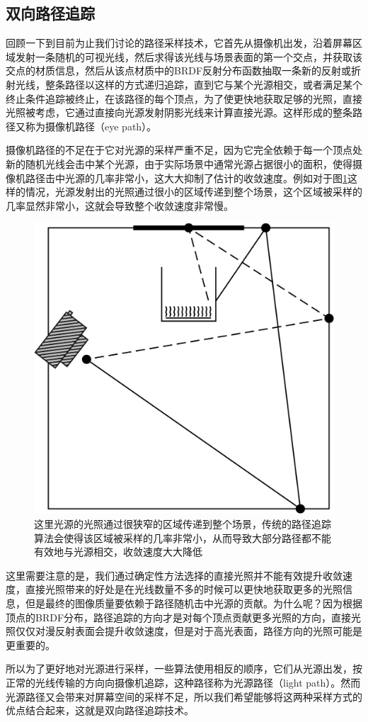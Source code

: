\subsection{双向路径追踪}\label{sec:bidirectional-path-tracing}
回顾一下到目前为止我们讨论的路径采样技术，它首先从摄像机出发，沿着屏幕区域发射一条随机的可视光线，然后求得该光线与场景表面的第一个交点，并获取该交点的材质信息，然后从该点材质中的BRDF反射分布函数抽取一条新的反射或折射光线，整条路径以这样的方式递归追踪，直到它与某个光源相交，或者满足某个终止条件追踪被终止，在该路径的每个顶点，为了使更快地获取足够的光照，直接光照被考虑，它通过直接向光源发射阴影光线来计算直接光源。这样形成的整条路径又称为摄像机路径（eye path）。

摄像机路径的不足在于它对光源的采样严重不足，因为它完全依赖于每一个顶点处新的随机光线会击中某个光源，由于实际场景中通常光源占据很小的面积，使得摄像机路径击中光源的几率非常小，这大大抑制了估计的收敛速度。例如对于图\ref{f:pt-bid-tracing}这样的情况，光源发射出的光照通过很小的区域传递到整个场景，这个区域被采样的几率显然非常小，这就会导致整个收敛速度非常慢。

\begin{figure}
\sidecaption
	\includegraphics[width=.3\textwidth]{figures/pt/path-9}
	\caption{这里光源的光照通过很狭窄的区域传递到整个场景，传统的路径追踪算法会使得该区域被采样的几率非常小，从而导致大部分路径都不能有效地与光源相交，收敛速度大大降低}
	\label{f:pt-bid-tracing}
\end{figure}

这里需要注意的是，我们通过确定性方法选择的直接光照并不能有效提升收敛速度，直接光照带来的好处是在光线数量不多的时候可以更快地获取更多的光照信息，但是最终的图像质量要依赖于路径随机击中光源的贡献。为什么呢？因为根据顶点的BRDF分布，路径追踪的方向才是对每个顶点贡献更多光照的方向，直接光照仅仅对漫反射表面会提升收敛速度，但是对于高光表面，路径方向的光照可能是更重要的。

所以为了更好地对光源进行采样，一些算法使用相反的顺序，它们从光源出发，按正常的光线传输的方向向摄像机追踪，这种路径称为光源路径（light path）。然而光源路径又会带来对屏幕空间的采样不足，所以我们希望能够将这两种采样方式的优点结合起来，这就是双向路径追踪技术。

